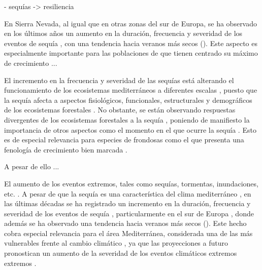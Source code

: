 - sequías -> resiliencia 

En Sierra Nevada, al igual que en otras zonas del sur de Europa, se ha observado en los últimos años un aumento en la duración, frecuencia y severidad de los eventos de sequía \autocites[ver capítulo \ref{sec:dendro} y apéndice \ref{sec:appendix:dendro};][]{VicenteSerranoetal2014EvidenceIncreasing,Staggeetal2017ObservedDrought,Spinonietal2015EuropeanDrought,Pascoaetal2017DroughtTrends}, con una tendencia hacia veranos más secos \autocites{Spinonietal2017PanEuropeanSeasonal} (). Este aspecto es especialmente importante para las poblaciones de \Qp que tienen centrado su máximo de crecimiento ... 

El incremento en la frecuencia y severidad de las sequías está alterando el funcionamiento de los ecosistemas mediterráneos a diferentes escalas \autocites{Penuelasetal2017ImpactsGlobal,Forneretal2018ExtremeDroughts,Liuetal2020EffectsDecadal,OgayaPenuelas2021ClimateChange}, puesto que la sequía afecta a aspectos fisiológicos, funcionales, estructurales y demográficos de los ecosistemas forestales \autocites{Allenetal2010GlobalOverview, Assaletal2016SpatialTemporal}. No obstante, se están observando respuestas divergentes de los ecosistemas forestales a la sequía \autocites{Andereggetal2020DivergentForest}, poniendo de manifiesto la importancia de otros aspectos como el momento en el que ocurre la sequía \autocites{Huangetal2018DroughtTiming}. Esto es de especial relevancia para especies de frondosas como el \Qpy que presenta una fenología de crecimiento bien marcada \autocites{PerezdeLisetal2016ChangesSpring}. 

A pesar de ello ... 


El aumento de los eventos extremos, tales como sequías, tormentas, inundaciones, etc. \autocite{IPCC2013ClimateChange}. A pesar de que la sequía es una característica del clima mediterráneo \autocites{Lionello2012}, en las últimas décadas se ha registrado un incremento en la duración, frecuencia y severidad de los eventos de sequía \autocites{LloydHughesSaunders2002DroughtClimatology, Sousaetal2011TrendsExtremes,Colletal2017DroughtVariability}, particularmente en el sur de Europa \autocites{VicenteSerranoetal2014EvidenceIncreasing,Staggeetal2017ObservedDrought,Spinonietal2015EuropeanDrought,Pascoaetal2017DroughtTrends}, donde además se ha observado una tendencia hacia veranos más secos \autocites{Spinonietal2017PanEuropeanSeasonal} (). Este hecho cobra especial relevancia para el área Mediterránea, considerada una de las más vulnerables frente al cambio climático \autocites{Giorgi2006ClimateChange}, ya que las proyecciones a futuro pronostican un aumento de la severidad de los eventos climáticos extremos extremos \autocites{Hoerlingetal2012IncreasedFrequency,IPCC2013ClimateChange,Trenberthetal2014GlobalWarming,Spinonietal2018WillDrought}.  


